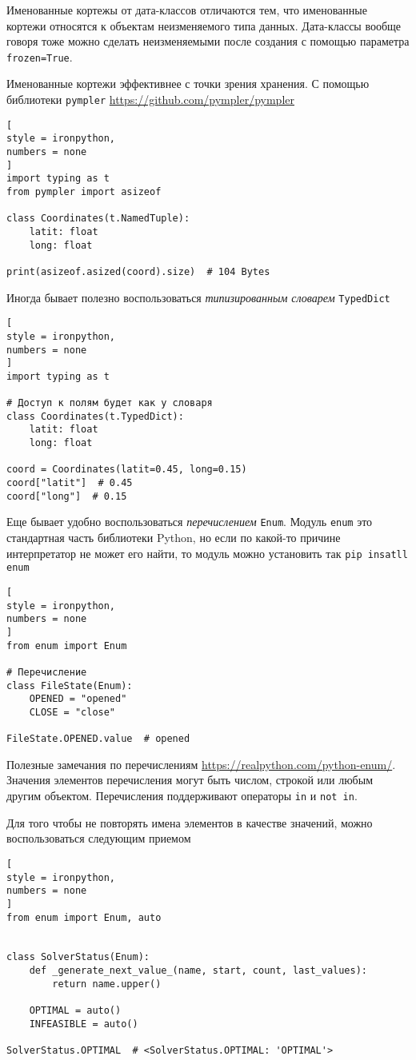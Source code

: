\documentclass[%
	11pt,
	a4paper,
	utf8,
		]{article}
\begin{document}
Именованные кортежы от дата-классов отличаются тем, что именованные кортежи относятся к объектам неизменяемого типа данных. Дата-классы вообще говоря тоже можно сделать неизменяемыми после создания с помощью параметра \verb|frozen=True|.

Именованные кортежи эффективнее с точки зрения хранения. С помощью библиотеки \verb|pympler| \url{https://github.com/pympler/pympler}
\begin{lstlisting}[
style = ironpython,
numbers = none
]
import typing as t
from pympler import asizeof

class Coordinates(t.NamedTuple):
    latit: float
    long: float
    
print(asizeof.asized(coord).size)  # 104 Bytes
\end{lstlisting}

Иногда бывает полезно воспользоваться \emph{типизированным словарем} \verb|TypedDict|
\begin{lstlisting}[
style = ironpython,
numbers = none	
]
import typing as t

# Доступ к полям будет как у словаря
class Coordinates(t.TypedDict):
    latit: float
    long: float
    
coord = Coordinates(latit=0.45, long=0.15)
coord["latit"]  # 0.45
coord["long"]  # 0.15
\end{lstlisting}

Еще бывает удобно воспользоваться \emph{перечислением} \verb|Enum|. Модуль \verb|enum| это стандартная часть библиотеки Python, но если по какой-то причине интерпретатор не может его найти, то модуль можно установить так \verb|pip insatll enum|
\begin{lstlisting}[
style = ironpython,
numbers = none
]
from enum import Enum

# Перечисление
class FileState(Enum):
    OPENED = "opened"
    CLOSE = "close"
    
FileState.OPENED.value  # opened
\end{lstlisting}

Полезные замечания по перечислениям \url{https://realpython.com/python-enum/}. Значения элементов перечисления могут быть числом, строкой или любым другим объектом. Перечисления поддерживают операторы \verb|in| и \verb*|not in|.

Для того чтобы не повторять имена элементов в качестве значений, можно воспользоваться следующим приемом
\begin{lstlisting}[
style = ironpython,
numbers = none
]
from enum import Enum, auto


class SolverStatus(Enum):
    def _generate_next_value_(name, start, count, last_values):
        return name.upper()
    
    OPTIMAL = auto()    
    INFEASIBLE = auto()

SolverStatus.OPTIMAL  # <SolverStatus.OPTIMAL: 'OPTIMAL'>
\end{lstlisting}
\end{document}
